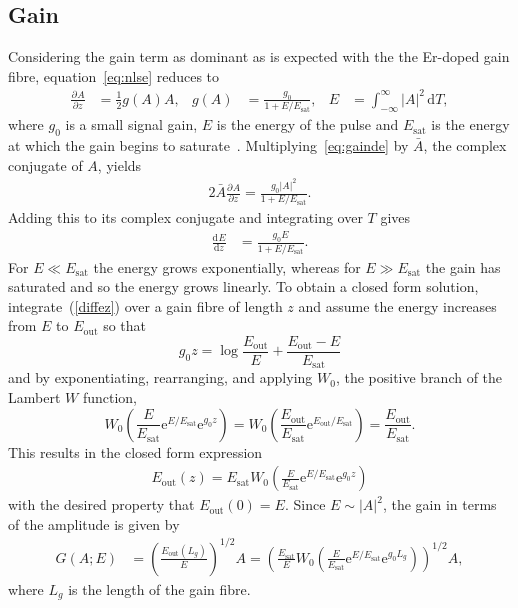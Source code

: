 \documentclass[12pt]{article}
\providecommand{\df}{\textrm{d}}
\newcommand{\diff}[3][]{\frac{\textrm{d}^{#1}#2}{\textrm{d}{#3}^{#1}}}
\newcommand{\pdiff}[3][]{\frac{\partial^{#1}#2}{\partial{#3}^{#1}}}
\newcommand{\Es}{E_{\textrm{sat}}}
\begin{document}
\subsection{Gain}
Considering the gain term as dominant as is expected with the the Er-doped gain fibre, equation~\eqref{eq:nlse} reduces to
\begin{align}
\label{eq:gainde}
	\pdiff{A}{z} &= \frac{1}{2} g(A) A,& g(A) &= \frac{g_0}{1 + E / \Es},& E &= \int_{-\infty}^\infty |A|^2 \, \df T,
\end{align}
where $g_0$ is a small signal gain, $E$ is the energy of the pulse and $\Es$ is the energy at which the gain begins to saturate~\cite{bohun, burgoyne2014, shtyrina, silfvast, yarutkina}.
Multiplying~\eqref{eq:gainde} by $\bar{A}$, the complex conjugate of $A$, yields
\begin{align*}
	2\bar{A} \pdiff{A}{z} = \frac{g_0 |A|^2}{1 + E / \Es}.
\end{align*}
Adding this to its complex conjugate and integrating over $T$ gives
\begin{align}
\label{diffez}
	\diff{E}{z} &= \frac{g_0 E}{1 + E / \Es}.
\end{align}
For $E \ll \Es$ the energy grows exponentially, whereas for $E \gg \Es$ the gain has saturated and so the energy grows linearly. To obtain a closed form solution, integrate~(\ref{diffez}) over a gain fibre of length $z$ and assume the energy increases from $E$ to $E_{\textrm{out}}$ so that
\[
	g_0 z = \log\frac{E_{\textrm{out}}}{E} + \frac{E_{\textrm{out}}-E}{\Es}
\]
and by exponentiating, rearranging, and applying $W_0$, the positive branch of the Lambert $W$ function,
\[
	 W_0\left(\frac{E}{\Es} \textrm{e}^{E/\Es} \textrm{e}^{g_0 z}\right) = 
	 W_0\left(\frac{E_{\textrm{out}}}{\Es} \textrm{e}^{E_{\textrm{out}}/\Es}\right) = \frac{E_{\textrm{out}}}{\Es}.
\]
This results in the closed form expression
\begin{align}
\label{eq:energy}
	E_{\textrm{out}}(z) = \Es W_0 \left( \frac{E}{\Es} \textrm{e}^{E/\Es} \textrm{e}^{g_0 z} \right)
\end{align}
with the desired property that $E_{\textrm{out}}(0)=E$. Since $E \sim |A|^2$, the gain in terms of the amplitude is given by
\begin{align}
\label{eq:gain}
	G(A;E) &= \left(\frac{E_{\textrm{out}}(L_g)}{E}\right)^{1/2}A = 
	\left( \frac{\Es}{E} W_0 \left( \frac{E}{\Es} \textrm{e}^{E/\Es} 
	\textrm{e}^{g_0 L_g} \right) \right)^{1/2} A,
\end{align}
where $L_g$ is the length of the gain fibre.
\end{document}

